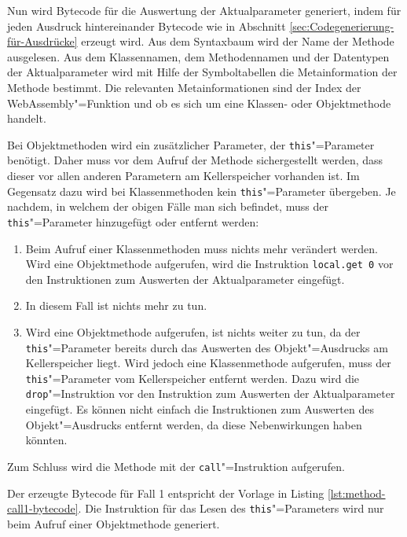 Nun wird Bytecode für die Auswertung der Aktualparameter generiert, indem für jeden Ausdruck hintereinander Bytecode wie in Abschnitt \ref{sec:Codegenerierung-für-Ausdrücke} erzeugt wird. Aus dem Syntaxbaum wird der Name der Methode ausgelesen. Aus dem Klassennamen, dem Methodennamen und der Datentypen der Aktualparameter wird mit Hilfe der Symboltabellen die Metainformation der Methode bestimmt. Die relevanten Metainformationen sind der Index der WebAssembly"=Funktion und ob es sich um eine Klassen- oder Objektmethode handelt.

Bei Objektmethoden wird ein zusätzlicher Parameter, der \lstinline{this}"=Parameter benötigt. Daher muss vor dem Aufruf der Methode sichergestellt werden, dass dieser vor allen anderen Parametern am Kellerspeicher vorhanden ist. Im Gegensatz dazu wird bei Klassenmethoden kein \lstinline{this}"=Parameter übergeben. Je nachdem, in welchem der obigen Fälle man sich befindet, muss der \lstinline{this}"=Parameter hinzugefügt oder entfernt werden:

\begin{enumerate}
    \item Beim Aufruf einer Klassenmethoden muss nichts mehr verändert werden. Wird eine Objektmethode aufgerufen, wird die Instruktion \lstinline{local.get 0} vor den Instruktionen zum Auswerten der Aktualparameter eingefügt.
    \item In diesem Fall ist nichts mehr zu tun.
    \item Wird eine Objektmethode aufgerufen, ist nichts weiter zu tun, da der \lstinline{this}"=Parameter bereits durch das Auswerten des Objekt"=Ausdrucks am Kellerspeicher liegt. Wird jedoch eine Klassenmethode aufgerufen, muss der \lstinline{this}"=Parameter vom Kellerspeicher entfernt werden. Dazu wird die \lstinline{drop}"=Instruktion vor den Instruktion zum Auswerten der Aktualparameter eingefügt. Es können nicht einfach die Instruktionen zum Auswerten des Objekt"=Ausdrucks entfernt werden, da diese Nebenwirkungen haben könnten.
\end{enumerate}

Zum Schluss wird die Methode mit der \lstinline{call}"=Instruktion aufgerufen.

Der erzeugte Bytecode für Fall 1 entspricht der Vorlage in Listing \ref{lst:method-call1-bytecode}. Die Instruktion für das Lesen des \lstinline{this}"=Parameters wird nur beim Aufruf einer Objektmethode generiert. 



